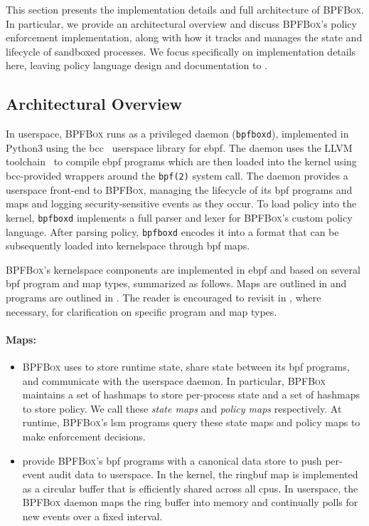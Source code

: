 \documentclass[
  fontsize=12pt,
  titlepage=firstiscover,
  paper=letter,
oneside,
  cleardoublepage=plain,
  parskip=half-,
  DIV=10,
  parindent,
  appendixprefix,
  chapterprefix,
  listof=totoc,
]{scrbook}
\newcommand{\bpfbox}{\textsc{BPFBox}}
\begin{document}
This section presents the implementation details and full architecture of \bpfbox{}.  In
particular, we provide an architectural overview and discuss \bpfbox{}'s policy
enforcement implementation, along with how it tracks and manages the state and lifecycle
of sandboxed processes. We focus specifically on implementation details here, leaving
policy language design and documentation to .

\subsection{Architectural Overview}\label{ss:bpfbox-architecture}

In userspace, \bpfbox{} runs as a privileged daemon (\texttt{bpfboxd}), implemented in
Python3 using the bcc~\cite{bcc} userspace library for \gls{ebpf}. The daemon uses the
LLVM toolchain~\cite{llvm_bpf} to compile \gls{ebpf} programs which are then loaded into
the kernel using bcc-provided wrappers around the \texttt{bpf(2)} system call. The daemon
provides a userspace front-end to \bpfbox{}, managing the lifecycle of its \gls{bpf}
programs and maps and logging security-sensitive events as they occur. To load policy into
the kernel, \texttt{bpfboxd} implements a full parser and lexer for \bpfbox{}'s custom
policy language.  After parsing policy, \texttt{bpfboxd} encodes it into a format that can
be subsequently loaded into kernelspace through \gls{bpf} maps.

\bpfbox{}'s kernelspace components are implemented in \gls{ebpf} and based on several
\gls{bpf} program and map types, summarized as follows. Maps are outlined in
\textbf{} and programs are outlined in \textbf{}. The reader
is encouraged to revisit  in ,
where necessary, for clarification on specific program and map types.

\paragraph*{Maps:}
\begin{itemize}
  \item \bpfbox{} uses \textbf{} to store runtime state, share state
  between its \gls{bpf} programs, and communicate with the userspace daemon. In
  particular, \bpfbox{} maintains a set of hashmaps to store per-process state and a set
  of hashmaps to store policy. We call these \textit{state maps} and \textit{policy maps}
  respectively.  At runtime, \bpfbox{}'s \gls{lsm} programs query these state maps and
  policy maps to make enforcement decisions.

  \item \textbf{} provide \bpfbox{}'s \gls{bpf} programs with a canonical
  data store to push per-event audit data to userspace. In the kernel, the ringbuf map is
  implemented as a circular buffer that is efficiently shared across all \glspl{cpu}.
  In userspace, the \bpfbox{} daemon maps the ring buffer into memory and continually
  polls for new events over a fixed interval.


\end{itemize}
\end{document}
